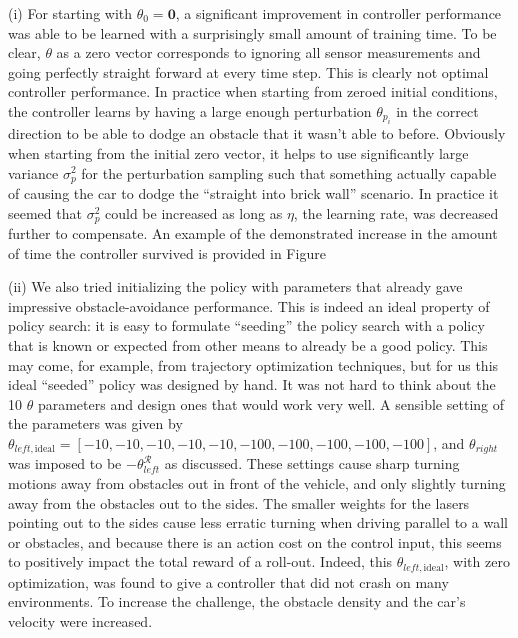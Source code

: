 \documentclass{article}
\begin{document}
(i) For starting with $\theta_0 = \mathbf{0}$, a significant improvement in controller performance was able to be learned with a surprisingly small amount of training time.  To be clear, $\theta$ as a zero vector corresponds to ignoring all sensor measurements and going perfectly straight forward at every time step.  This is clearly not optimal controller performance.  In practice when starting from zeroed initial conditions, the controller learns by having a large enough perturbation $\theta_{p_i}$ in the correct direction to be able to dodge an obstacle that it wasn't able to before.  Obviously when starting from the initial zero vector, it helps to use significantly large variance $\sigma_p^2$ for the perturbation sampling such that something actually capable of causing the car to dodge the ``straight into brick wall'' scenario.  In practice it seemed that $\sigma_p^2$ could be increased as long as $\eta$, the learning rate, was decreased further to compensate.  An example of the demonstrated increase in the amount of time the controller survived is provided in Figure \label{figures/policySearch_zeroVector_duration.png}

(ii) We also tried initializing the policy with parameters that already gave impressive obstacle-avoidance performance.  This is indeed an ideal property of policy search: it is easy to formulate ``seeding'' the policy search with a policy that is known or expected from other means to already be a good policy.  This may come, for example, from trajectory optimization techniques, but for us this ideal ``seeded'' policy was designed by hand. It was not hard to think about the 10 $\theta$ parameters and design ones that would work very well.  A sensible setting of the parameters was given by $\theta_{left, \text{ideal}} = [-10, -10, -10, -10, -10, -100, -100, -100, -100, -100 ]$, and $\theta_{right}$ was imposed to be $-\theta_{left}^{\mathcal{R}}$ as discussed. These settings cause sharp turning motions away from obstacles out in front of the vehicle, and only slightly turning away from the obstacles out to the sides.  The smaller weights for the lasers pointing out to the sides cause less erratic turning when driving parallel to a wall or obstacles, and because there is an action cost on the control input, this seems to positively impact the total reward of a roll-out.  Indeed, this $\theta_{left, \text{ideal}} $, with zero optimization, was found to give a controller that did not crash on many environments.  To increase the challenge, the obstacle density and the car's velocity were increased.
\end{document}
